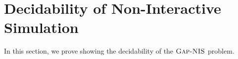 \documentclass[11pt]{article}
\newcommand{\norm}[2]{\begin{Vmatrix} #2 \end{Vmatrix}_{#1}}
\newcommand{\bu}{{\bm u}}
\newcommand{\bv}{{\bm v}}
\newcommand{\calR}{\mathcal{R}}
\newcommand{\ANIS}{\text{\sc Gap-NIS}}
\begin{document}

\section{Decidability of Non-Interactive Simulation} \label{sec:decidability}

In this section, we prove  showing the decidability of the $\ANIS$ problem.
\end{document}
